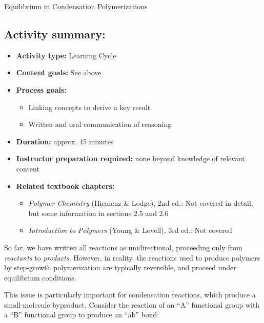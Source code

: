 \begin{activity}{Equilibrium in Condensation Polymerizations}
\begin{instructornotes}
	\subsection*{Activity summary:}
	\begin{itemize}
		\item \textbf{Activity type:} Learning Cycle
		\item \textbf{Content goals:} See above
		\item \textbf{Process goals:} %
			\begin{itemize}
				\item Linking concepts to derive a key result
				\item Written and oral communication of reasoning
			\end{itemize}
		\item \textbf{Duration:} approx. 45 minutes
		\item \textbf{Instructor preparation required:} none beyond knowledge of relevant content
		\item \textbf{Related textbook chapters:}
			\begin{itemize}
				\item \emph{Polymer Chemistry} (Hiemenz \& Lodge), 2nd ed.: Not covered in detail, but some information in sections 2.5 and 2.6
				\item \emph{Introduction to Polymers} (Young \& Lovell), 3rd ed.: Not covered
			\end{itemize}
	\end{itemize}

\end{instructornotes}


\begin{model}

	So far, we have written all reactions as unidirectional, proceeding only from \emph{reactants} to \emph{products}.
	However, in reality, the reactions used to produce polymers by step-growth polymerization are typically reversible, and proceed under equilibrium conditions.
	
	This issue is particularly important for condensation reactions, which produce a small-molecule byproduct.
	Consider the reaction of an ``A'' functional group with a ``B'' functional group to produce an ``ab'' bond:
	

\end{model}
\end{activity}
